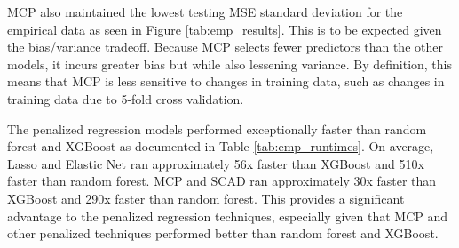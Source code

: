 \documentclass{article}
\begin{document}

	
	MCP also maintained the lowest testing MSE standard deviation for the empirical data as seen in Figure \ref{tab:emp_results}. This is to be expected given the bias/variance tradeoff. Because MCP selects fewer predictors than the other models, it incurs greater bias but while also lessening variance. By definition, this means that MCP is less sensitive to changes in training data, such as changes in training data due to 5-fold cross validation. 
	
	The penalized regression models performed exceptionally faster than random forest and XGBoost as documented in Table \ref{tab:emp_runtimes}. On average, Lasso and Elastic Net ran approximately 56x faster than XGBoost and 510x faster than random forest. MCP and SCAD ran approximately 30x faster than XGBoost and 290x faster than random forest. This provides a significant advantage to the penalized regression techniques, especially given that MCP and other penalized techniques performed better than random forest and XGBoost. 
	
\end{document}
